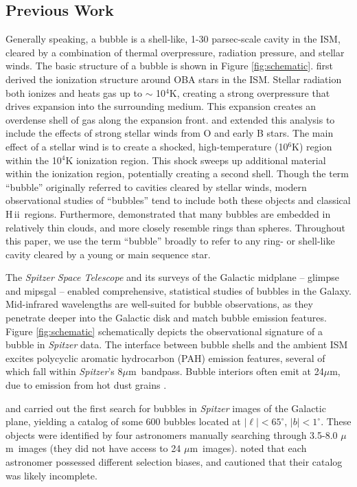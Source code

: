 \documentclass[preprint]{aastex}
\newcommand{\um}[0]{$\mu$m}
\newcommand{\hii}[0]{{\sc H\,ii}}
\begin{document}
\subsection{Previous Work}
\label{sec:previous}

Generally speaking, a bubble is a shell-like, 1-30 parsec-scale cavity in the ISM, cleared by a combination of thermal overpressure, radiation pressure, and stellar winds. The basic structure of a bubble is shown in Figure \ref{fig:schematic}. \cite{Stromgren39} first derived the ionization structure around OBA stars in the ISM. Stellar radiation both ionizes and heats gas up to $\sim$ 10$^4$K, creating a strong overpressure that drives expansion into the surrounding medium. This expansion creates an overdense shell of gas along the expansion front. \cite{Castor75} and \cite{Weaver77} extended this analysis to include the effects of strong stellar winds from O and early B stars. The main effect of a stellar wind is to create a shocked, high-temperature (10$^6$K) region within the 10$^4$K ionization region. This shock sweeps up additional material within the ionization region, potentially creating a second shell. Though the term ``bubble'' originally referred to cavities cleared by stellar winds, modern observational studies of ``bubbles'' tend to include both these objects and classical \hii\, regions. Furthermore, \cite{Beaumont10} demonstrated that many bubbles are embedded in relatively thin clouds, and more closely resemble rings than spheres. Throughout this paper, we use the term ``bubble'' broadly to refer to any ring- or shell-like cavity cleared by a young or main sequence star.

The \emph{Spitzer Space Telescope} and its surveys of the Galactic midplane -- {\sc glimpse} \citep{Benjamin03} and {\sc mipsgal} \citep{Carey09} -- enabled comprehensive, statistical studies of bubbles in the Galaxy. Mid-infrared wavelengths are well-suited for bubble observations, as they penetrate deeper into the Galactic disk and match bubble emission features. Figure \ref{fig:schematic} schematically depicts the observational signature of a bubble in \emph{Spitzer} data. The interface between bubble shells and the ambient ISM excites polycyclic aromatic hydrocarbon (PAH) emission features, several of which fall within \emph{Spitzer}'s 8\um\, bandpass. Bubble interiors often emit at 24\um, due to emission from hot dust grains \citep{Everett10}. 

\cite{Churchwell06} and \cite{Churchwell07} carried out the first search for bubbles in \emph{Spitzer} images of the Galactic plane, yielding  a catalog of some 600 bubbles located at $|\ell| < 65^\circ$, $|b| < 1^\circ$. These objects were identified by four astronomers manually searching through 3.5-8.0 \um\, images (they did not have access to 24 \um\, images). \cite{Churchwell06} noted that each astronomer possessed different selection biases, and cautioned that their catalog was likely incomplete.
\end{document}
